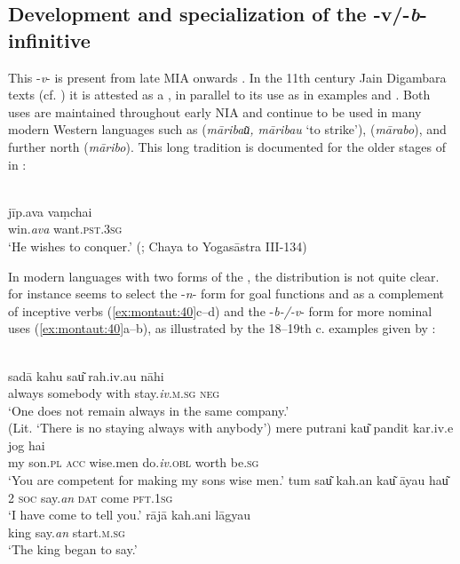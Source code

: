 \documentclass[output=paper]{langsci/langscibook}
\begin{document}
\subsection{Development and specialization of the -v/-\textit{b}{}- infinitive}\label{sec:montaut:4.2}

This -\textit{v}{}-  is present from late {MIA onwards} \citep[388]{Pischel1900}. In the 11th century Jain Digambara texts (cf. \citealt[322]{Tagare1948}) it is attested as a , in parallel to its  use as in examples  and . Both uses are maintained throughout early NIA and continue to be used in many modern Western languages such as  (\textit{māribau͂, māribau} ‘to strike’),  (\textit{mārabo}), and  further north (\textit{māribo}). This long tradition is documented for the older stages of   in \citet[121]{Tessitori19141916}:

\ea \label{ex:montaut:39}
\\
\gll jīp.ava vaṃchai\\
win.\textit{ava}   want.\textsc{pst.3sg} \\
\glt ‘He wishes to conquer.’ (\citealt[121]{Tessitori19141916}; Chaya to Yogasāstra III-134)
\z 

In modern languages with two forms of the , the distribution is not quite clear.  for instance seems to select the -\textit{n}{}- form for goal functions and as a complement of inceptive verbs (\ref{ex:montaut:40}c--d) and the -\textit{b-/-v}{}- form for more nominal uses (\ref{ex:montaut:40}a--b), as illustrated by the 18--19th c. examples given by \citet[289]{Kellogg1875}:

\ea \label{ex:montaut:40}
\ea 
{}\\
\gll sadā kahu  sau͂  rah.iv.au        nāhi \\
always   somebody   with     stay.\textit{iv}.\textsc{m.sg}  \textsc{neg} \\
\glt ‘One does not remain always in the same company.’ \\
(Lit. ‘There is no staying always with anybody’)
\ex   
\gll mere putrani kau͂   pandit       kar.iv.e  jog  hai\\
 my   son.\textsc{pl} \textsc{acc}   wise.men   do.\textit{iv}.\textsc{obl}  worth  be.\textsc{sg} \\
\glt ‘You are competent for making my sons wise men.’
\ex 
\gll tum sau͂  kah.an kau͂  āyau  hau͂\\
\textsc{2}  \textsc{soc}   say.\textit{an}  \textsc{dat}   come  \textsc{pft.1sg} \\
\glt ‘I have come to tell you.’
\ex  
\gll rājā   kah.ani   lāgyau\\     
king  say.\textit{an}  start.\textsc{m.sg}\\
\glt ‘The king began to say.’
\z 
\z 
\end{document}
